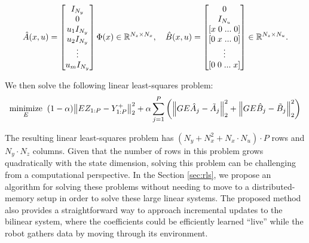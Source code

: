 \documentclass{article}
\begin{document}
\begin{equation}
  \hat{A}(x,u) =  \begin{bmatrix} 
    I_{N_y} \\ 0 \\ u_1 I_{N_y} \\ u_2 I_{N_y} \\ \vdots \\ u_m I_{N_y} 
  \end{bmatrix} \Phi(x) \in \mathbb{R}^{N_z \times N_x}, \quad
  \hat{B}(x,u) = \begin{bmatrix} 
    0 \\ 
    I_{N_u} \\ 
    [x \; 0 \; ... \; 0] \\
    [0 \; x \; ... \; 0] \\
    \vdots \\
    [0 \; 0 \; ... \; x] \\
  \end{bmatrix} \in \mathbb{R}^{N_z \times N_u}.
\end{equation}

We then solve the following linear least-squares problem:
\begin{align} \label{opt:jdmd}
  \underset{E}{\text{minimize}} \;\; 
    (1-\alpha) \norm{E Z_{1:P} - Y_{1:P}^+}_2^2 + 
        \alpha \sum_{j=1}^P \left( 
          \norm{G E \hat{A}_j - \tilde{A}_j}_2^2 + 
          \norm{G E \hat{B}_j - \tilde{B}_j}_2^2 \right)
\end{align}

The resulting linear least-squares problem has $(N_y + N_x^2 + N_x \cdot N_u) \cdot P$ rows
and $N_y \cdot N_z$ columns. Given that the number of rows in this problem grows
quadratically with the state dimension, solving this problem can be challenging from a
computational perspective. In the Section \ref{sec:rls}, we propose an algorithm for solving
these problems without needing to move to a distributed-memory setup in order to solve these
large linear systems. The proposed method also provides a straightforward way to approach
incremental updates to the bilinear system, where the coefficients could be efficiently
learned ``live'' while the robot gathers data by moving through its environment.

\end{document}
